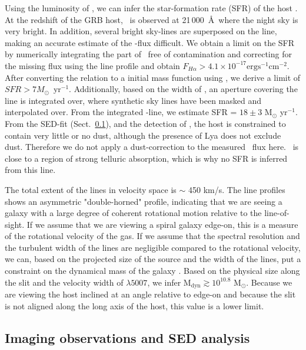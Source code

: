 \documentclass{aa}    %
\begin{document}
Using the luminosity of \ha, we can infer the star-formation rate (SFR) of the
host \citep{Kennicutt1998}. At the redshift of the GRB host, \ha~is observed
at 21\,000~\AA~where the night sky is very bright. In addition, several bright
sky-lines are superposed on the line, making an accurate estimate of the
\ha-flux difficult. We obtain a limit on the SFR by numerically integrating the
part of \ha~free of contamination and correcting for the missing flux using the
line profile and obtain $F_{H \alpha} > 4.1 \times 10^{-17} \mathrm{erg}
\mathrm{s}^{-1} \mathrm{cm}^{-2}$. After converting the \citet{Kennicutt1998}
relation to a \citet{Chabrier2003} initial mass function using
\citet{Madau2014}, we derive a limit of $SFR > 7 M_\odot$~yr$^{-1}$.
Additionally, based on the width of \oiii, an aperture covering the line is
integrated over, where synthetic sky lines \citep{Noll2012, Jones2013} have been
masked and interpolated over. From the integrated \ha-line, we estimate SFR =
$18 \pm 3$ M$_\odot$ yr$^{-1}$. From the SED-fit (Sect.~\ref{SED}), and the
detection of \lya, the host is constrained to contain very little or no dust,
although the presence of Lya does not exclude dust. Therefore we do not apply a
dust-correction to the measured \ha~flux here. \oii~is close to a region of
strong telluric absorption, which is why no SFR is inferred from this line.

The total extent of the lines in velocity space is $\sim$ 450 km/s. The line
profiles shows an asymmetric "double-horned" profile, indicating that we are
seeing a galaxy with a large degree of coherent rotational motion relative to
the line-of-sight. If we assume that we are viewing a spiral galaxy edge-on,
this is a measure of the rotational velocity of the gas. If we assume that the
spectral resolution and the turbulent width of the lines are negligible compared
to the rotational velocity, we can, based on the projected size of the source
and the width of the lines, put a constraint on the dynamical mass of the galaxy
\citep{DeBlok2014}. Based on the physical size along the slit and the velocity
width of \oiii$\lambda5007$, we infer M$_\text{dyn} \gtrsim 10^{10.8}$
M$_\odot$. Because we are viewing the host inclined at an angle relative to
edge-on and because the slit is not aligned along the long axis of the host,
this value is a lower limit. 

\subsection{Imaging observations and SED analysis} \label{SED}
\end{document}

